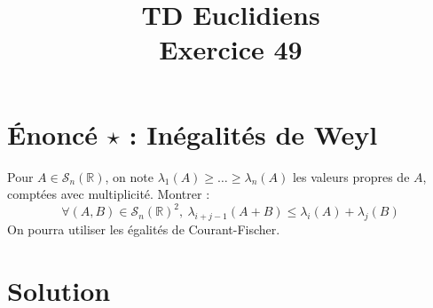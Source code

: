 \documentclass[french]{article}
\title{TD Euclidiens\\ Exercice 49}
\date{}
\newcommand{\R}{\mathbb{R}}
\begin{document}
\maketitle

\section{Énoncé $\star$ : Inégalités de Weyl}
Pour $A\in\mathcal{S}_n(\R)$, on note $\lambda_1(A)\geqslant\ldots\geqslant\lambda_n(A)$ les valeurs propres de $A$, comptées avec multiplicité. Montrer : $$\forall (A,B)\in\mathcal{S}_n(\R)^2,\ \lambda_{i+j-1}(A+B)\leqslant\lambda_i(A)+\lambda_j(B)$$
On pourra utiliser les égalités de Courant-Fischer.
\section{Solution}
\end{document}
